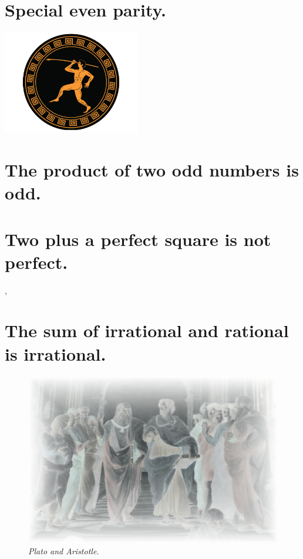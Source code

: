 \documentclass[preview]{standalone}
\begin{document}
\section{Special even parity.}

\begin{center}
    \includegraphics[width=6cm]{../resources/jpg/1.6.introduction.to.proofs/olympics.jpg}
\end{center}


\section{The product of two odd numbers is odd.}

\pagebreak


\section{Two plus a perfect square is not perfect.}

\vspace{1.5\baselineskip}
\sep
\pagebreak


\section{The sum of irrational and rational is irrational.}

\begin{figure}[h!]
    \centering
    \includegraphics[width=12.5cm]{../resources/jpg/1.6.introduction.to.proofs/plato-republic.jpg}
    \caption*{\emph{Plato and Aristotle.}}
\end{figure}
\end{document}
